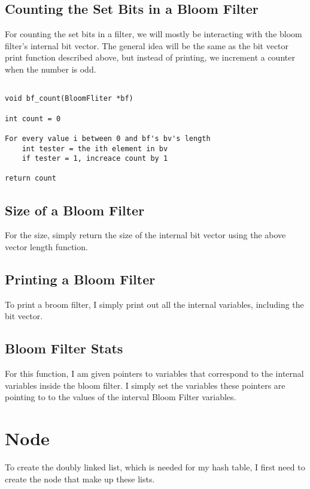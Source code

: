 \documentclass[11pt]{article}
\begin{document}
\subsection{Counting the Set Bits in a Bloom Filter}

For counting the set bits in a filter, we will mostly be interacting with the bloom filter's internal bit vector. The general idea will be the same as the bit vector print function described above, but instead of printing, we increment a counter when the number is odd.

\begin{verbatim}

void bf_count(BloomFliter *bf)

int count = 0

For every value i between 0 and bf's bv's length
    int tester = the ith element in bv
    if tester = 1, increace count by 1

return count

\end{verbatim}

\subsection{Size of a Bloom Filter}

For the size, simply return the size of the internal bit vector using the above vector length function.

\subsection{Printing a Bloom Filter}

To print a broom filter, I simply print out all the internal variables, including the bit vector.

\subsection{Bloom Filter Stats}

For this function, I am given pointers to variables that correspond to the internal variables inside the bloom filter. I simply set the variables these pointers are pointing to to the values of the interval Bloom Filter variables.

\section{Node}

To create the doubly linked list, which is needed for my hash table, I first need to create the node that make up these lists.
\end{document}
